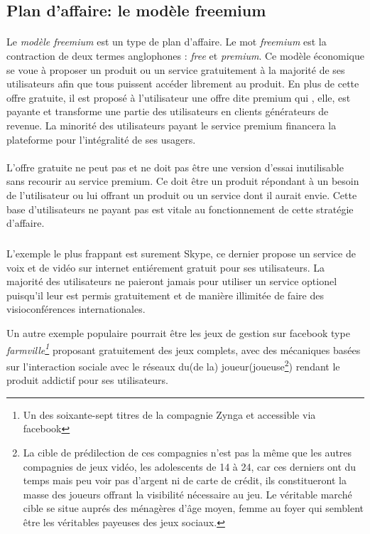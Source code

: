 \documentclass[11pt, a4paper ]{article}
\begin{document}
\begin{spacing}{1.5}
			\subsection{Plan d'affaire: le modèle freemium} %

\paragraph{}
Le \emph{modèle freemium} est un type de plan d'affaire. Le mot \emph{freemium} est la contraction de deux termes anglophones : \emph{free} et \emph{premium}. Ce modèle économique se voue à proposer un produit ou un service gratuitement à la majorité de ses utilisateurs afin que tous puissent accéder librement au produit. En plus de cette offre gratuite, il est proposé à l'utilisateur une offre dite premium qui , elle, est payante et transforme une partie des utilisateurs en clients générateurs de revenue. La minorité des utilisateurs payant le service premium financera la plateforme pour l'intégralité de ses usagers.


\paragraph{} %
L'offre gratuite ne peut pas et ne doit pas être une version d'essai inutilisable sans recourir au service premium. Ce doit être un produit répondant à un besoin de l'utilisateur ou lui offrant un produit ou un service dont il aurait envie. Cette base d'utilisateurs ne payant pas est vitale au fonctionnement de cette stratégie d'affaire.

\subparagraph{} %
L'exemple le plus frappant est surement Skype, ce dernier propose un service de voix et de vidéo sur internet entiérement gratuit pour ses utilisateurs. La majorité des utilisateurs ne paieront jamais pour utiliser un service optionel puisqu'il leur est permis gratuitement et de manière illimitée de faire des visioconférences internationales.

Un autre exemple populaire pourrait être les jeux de gestion sur facebook type \emph{farmville\footnote{Un des soixante-sept titres de la compagnie Zynga et accessible via facebook}} proposant gratuitement des jeux complets, avec des mécaniques basées sur l'interaction sociale avec le réseaux du(de la) joueur(joueuse\footnote{La cible de prédilection de ces compagnies n'est pas la même que les autres compagnies de jeux vidéo, les adolescents de 14 à 24, car ces derniers ont du temps mais peu voir pas d'argent ni de carte de crédit, ils constitueront la masse des joueurs offrant la visibilité nécessaire au jeu. Le véritable marché cible se situe auprés des ménagères d'âge moyen, femme au foyer qui semblent être les véritables payeuses des jeux sociaux. }) rendant le produit addictif pour ses utilisateurs.


\end{spacing}
\end{document}
